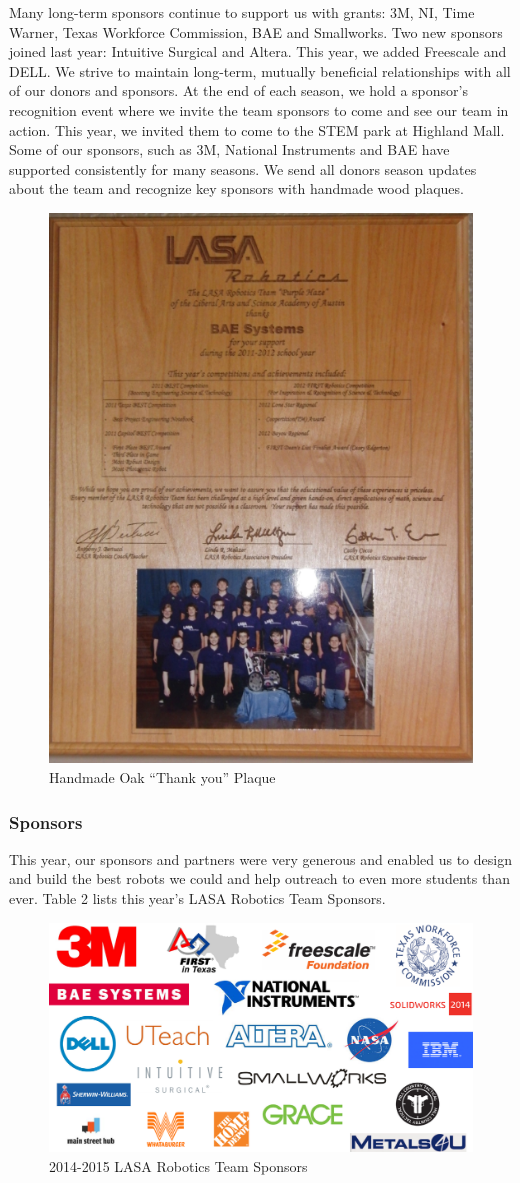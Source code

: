 Many long-term sponsors continue to support us with grants: 3M, NI, Time Warner, Texas Workforce Commission, BAE and Smallworks.  Two new sponsors joined last year: Intuitive Surgical and Altera. This year, we added Freescale and DELL.  We strive to maintain long-term, mutually beneficial relationships with all of our donors and sponsors.  At the end of each season, we hold a sponsor’s recognition event where we invite the team sponsors to come and see our team in action.  This year, we invited them to come to the STEM park at Highland Mall.  Some of our sponsors, such as 3M, National Instruments and BAE have supported consistently for many seasons.  We send all donors season updates about the team and recognize key sponsors with handmade wood plaques. 

\begin{figure}[H]
	\centering
	\includegraphics[height=0.3\linewidth]{thankyou}
	\caption[]{Handmade Oak “Thank you” Plaque}
	\label{fig:thankyou}
\end{figure}

\subsubsection{Sponsors}
This year, our sponsors and partners were very generous and enabled us to design and build the best robots we could and help outreach to even more students than ever.  Table 2 lists this year’s LASA Robotics Team Sponsors.

\begin{figure}[H]
	\centering
	\includegraphics[height=0.3\linewidth]{sponsors}
	\caption[]{2014-2015 LASA Robotics Team Sponsors}
	\label{fig:sponsors}
\end{figure}

